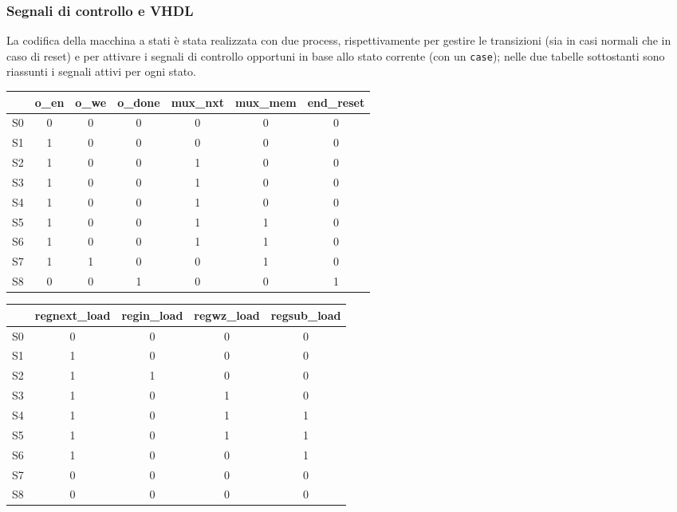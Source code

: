\subsubsection{Segnali di controllo e VHDL}
La codifica della macchina a stati \`e stata realizzata con due process, rispettivamente per gestire le transizioni (sia in casi normali che in caso di reset) e per attivare i segnali di controllo opportuni in base allo stato corrente (con un \texttt{case}); nelle due tabelle sottostanti sono riassunti i segnali attivi per ogni stato.
\begin{center}
	\begin{tabular}[width=\textwidth]{c|c c c|c c|c}
		  & o\_en & o\_we & o\_done & mux\_nxt & mux\_mem & end\_reset \\
		\hline
		S0 & 0 & 0 & 0 & 0 & 0 & 0 \\
		S1 & 1 & 0 & 0 & 0 & 0 & 0 \\
		S2 & 1 & 0 & 0 & 1 & 0 & 0 \\
		S3 & 1 & 0 & 0 & 1 & 0 & 0 \\
		S4 & 1 & 0 & 0 & 1 & 0 & 0 \\
		S5 & 1 & 0 & 0 & 1 & 1 & 0 \\
		S6 & 1 & 0 & 0 & 1 & 1 & 0 \\
		S7 & 1 & 1 & 0 & 0 & 1 & 0 \\
		S8 & 0 & 0 & 1 & 0 & 0 & 1 
	\end{tabular}
\end{center}
\begin{center}
	\begin{tabular}[width=\textwidth]{c|c c c c}
		 & regnext\_load & regin\_load & regwz\_load & regsub\_load \\
		\hline
		S0 & 0 & 0 & 0 & 0 \\
		S1 & 1 & 0 & 0 & 0 \\
		S2 & 1 & 1 & 0 & 0 \\ 
		S3 & 1 & 0 & 1 & 0 \\
		S4 & 1 & 0 & 1 & 1 \\
		S5 & 1 & 0 & 1 & 1 \\ 
		S6 & 1 & 0 & 0 & 1 \\
		S7 & 0 & 0 & 0 & 0 \\
		S8 & 0 & 0 & 0 & 0
	\end{tabular}
\end{center}